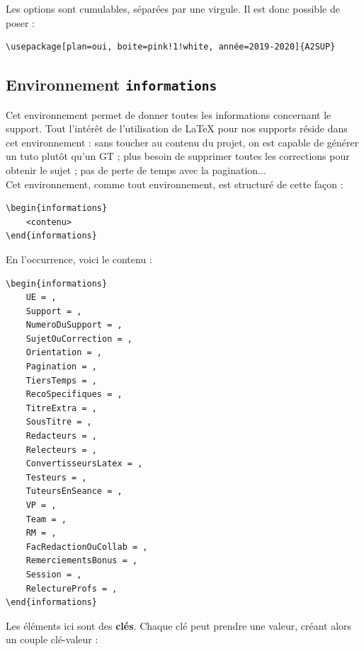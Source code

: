 \documentclass[a4paper,11pt]{article}
\begin{document}
\bigskip

Les options sont cumulables, séparées par une virgule. Il est donc possible de poser :

\begin{lstlisting}
\usepackage[plan=oui, boite=pink!1!white, année=2019-2020]{A2SUP}
\end{lstlisting}


\subsection{Environnement \texttt{informations}}\label{informations}

Cet environnement permet de donner toutes les informations concernant le support. Tout l'intérêt de l'utilisation de \LaTeX{} pour nos supports réside dans cet environnement : sans toucher au contenu du projet, on est capable de générer un tuto plutôt qu'un GT ; plus besoin de supprimer toutes les corrections pour obtenir le sujet ; pas de perte de temps avec la pagination...\\

Cet environnement, comme tout environnement, est structuré de cette façon :

\begin{lstlisting}
\begin{informations}
    <contenu>
\end{informations}
\end{lstlisting}

En l'occurrence, voici le contenu :


\begin{lstlisting}
\begin{informations}
    UE = ,
    Support = ,
    NumeroDuSupport = ,
    SujetOuCorrection = ,
    Orientation = ,
    Pagination = ,
    TiersTemps = ,
    RecoSpecifiques = ,
    TitreExtra = ,
    SousTitre = ,
    Redacteurs = ,
    Relecteurs = ,
    ConvertisseursLatex = ,
    Testeurs = ,
    TuteursEnSeance = ,
    VP = ,
    Team = ,
    RM = ,
    FacRedactionOuCollab = ,
    RemerciementsBonus = ,
    Session = ,
    RelectureProfs = ,
\end{informations}
\end{lstlisting}

\newpage

Les éléments ici sont des \textbf{clés}. Chaque clé peut prendre une valeur, créant alors un couple clé-valeur :
\end{document}
